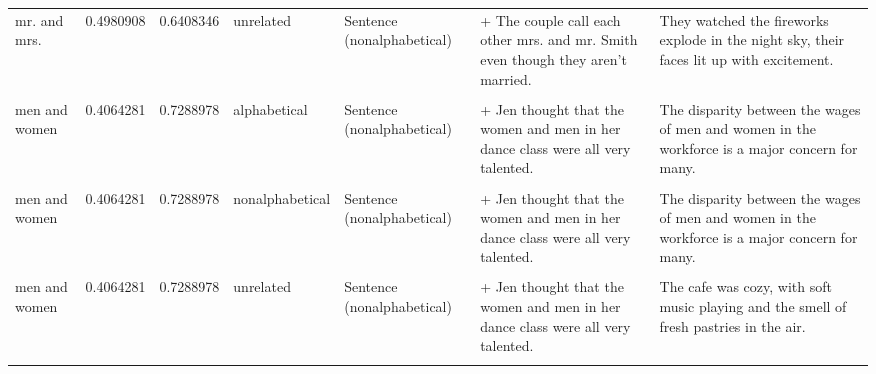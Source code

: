 \documentclass[
  12pt,
]{scrartcl}
\begin{document}
\begin{landscape}
\begin{longtable}{lrrllll}
mr. and mrs. & 0.4980908 & 0.6408346 & unrelated & Sentence (nonalphabetical) & + The couple call each other mrs. and mr. Smith even though they aren't married. & They watched the fireworks explode in the night sky, their faces lit up with excitement.\\
\cellcolor{gray!6}{men and women} & \cellcolor{gray!6}{0.4064281} & \cellcolor{gray!6}{0.7288978} & \cellcolor{gray!6}{alphabetical} & \cellcolor{gray!6}{Sentence (alphabetical)} & \cellcolor{gray!6}{+ Jen thought that the men and women in her dance class were all very talented.} & \cellcolor{gray!6}{The disparity between the wages of men and women in the workforce is a major concern for many.}\\
\addlinespace
men and women & 0.4064281 & 0.7288978 & alphabetical & Sentence (nonalphabetical) & + Jen thought that the women and men in her dance class were all very talented. & The disparity between the wages of men and women in the workforce is a major concern for many.\\
\cellcolor{gray!6}{men and women} & \cellcolor{gray!6}{0.4064281} & \cellcolor{gray!6}{0.7288978} & \cellcolor{gray!6}{nonalphabetical} & \cellcolor{gray!6}{Sentence (alphabetical)} & \cellcolor{gray!6}{+ Jen thought that the men and women in her dance class were all very talented.} & \cellcolor{gray!6}{The disparity between the wages of men and women in the workforce is a major concern for many.}\\
men and women & 0.4064281 & 0.7288978 & nonalphabetical & Sentence (nonalphabetical) & + Jen thought that the women and men in her dance class were all very talented. & The disparity between the wages of men and women in the workforce is a major concern for many.\\
\cellcolor{gray!6}{men and women} & \cellcolor{gray!6}{0.4064281} & \cellcolor{gray!6}{0.7288978} & \cellcolor{gray!6}{unrelated} & \cellcolor{gray!6}{Sentence (alphabetical)} & \cellcolor{gray!6}{+ Jen thought that the men and women in her dance class were all very talented.} & \cellcolor{gray!6}{The cafe was cozy, with soft music playing and the smell of fresh pastries in the air.}\\
men and women & 0.4064281 & 0.7288978 & unrelated & Sentence (nonalphabetical) & + Jen thought that the women and men in her dance class were all very talented. & The cafe was cozy, with soft music playing and the smell of fresh pastries in the air.\\
\addlinespace
\cellcolor{gray!6}{money and time} & \cellcolor{gray!6}{-0.3966303} & \cellcolor{gray!6}{0.3490212} & \cellcolor{gray!6}{alphabetical} & \cellcolor{gray!6}{Sentence (alphabetical)} & \cellcolor{gray!6}{+ The amount of money and time required to fix it made it quite the project.} & \cellcolor{gray!6}{Managing money and time effectively is key to achieving financial goals.}\\

\end{longtable}
\end{landscape}
\end{document}
